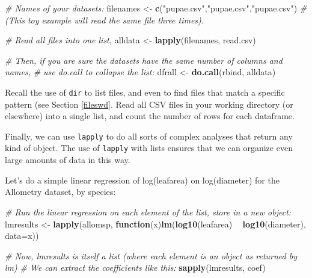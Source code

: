 \documentclass[]{book}
\newenvironment{Shaded}{\begin{snugshade}}{\end{snugshade}}
\newcommand{\CommentTok}[1]{\textcolor[rgb]{0.56,0.35,0.01}{\textit{#1}}}
\newcommand{\ControlFlowTok}[1]{\textcolor[rgb]{0.13,0.29,0.53}{\textbf{#1}}}
\newcommand{\DataTypeTok}[1]{\textcolor[rgb]{0.13,0.29,0.53}{#1}}
\newcommand{\KeywordTok}[1]{\textcolor[rgb]{0.13,0.29,0.53}{\textbf{#1}}}
\newcommand{\NormalTok}[1]{#1}
\newcommand{\OperatorTok}[1]{\textcolor[rgb]{0.81,0.36,0.00}{\textbf{#1}}}
\newcommand{\StringTok}[1]{\textcolor[rgb]{0.31,0.60,0.02}{#1}}
\let\BeginKnitrBlock\begin \let\EndKnitrBlock\end
\begin{document}
\begin{Shaded}
\begin{Highlighting}[]
\CommentTok{# Names of your datasets:}
\NormalTok{filenames <-}\StringTok{ }\KeywordTok{c}\NormalTok{(}\StringTok{"pupae.csv"}\NormalTok{,}\StringTok{"pupae.csv"}\NormalTok{,}\StringTok{"pupae.csv"}\NormalTok{)}
\CommentTok{# (This toy example will read the same file three times).}

\CommentTok{# Read all files into one list,}
\NormalTok{alldata <-}\StringTok{ }\KeywordTok{lapply}\NormalTok{(filenames, read.csv)}

\CommentTok{# Then, if you are sure the datasets have the same number of columns and names,}
\CommentTok{# use do.call to collapse the list:}
\NormalTok{dfrall <-}\StringTok{ }\KeywordTok{do.call}\NormalTok{(rbind, alldata)}
\end{Highlighting}
\end{Shaded}

\BeginKnitrBlock{rmdtry}
Recall the use of \texttt{dir} to list files, and even to find files that match a specific pattern (see Section \ref{fileswd}. Read all CSV files in your working directory (or elsewhere) into a single list, and count the number of rows for each dataframe.
\EndKnitrBlock{rmdtry}

Finally, we can use \texttt{lapply} to do all sorts of complex analyses that return any kind of object. The use of \texttt{lapply} with lists ensures that we can organize even large amounts of data in this way.

Let's do a simple linear regression of log(leafarea) on log(diameter) for the Allometry dataset, by species:

\begin{Shaded}
\begin{Highlighting}[]
\CommentTok{# Run the linear regression on each element of the list, store in a new object:}
\NormalTok{lmresults <-}\StringTok{ }\KeywordTok{lapply}\NormalTok{(allomsp, }\ControlFlowTok{function}\NormalTok{(x)}\KeywordTok{lm}\NormalTok{(}\KeywordTok{log10}\NormalTok{(leafarea) }\OperatorTok{~}\StringTok{ }\KeywordTok{log10}\NormalTok{(diameter), }\DataTypeTok{data=}\NormalTok{x))}

\CommentTok{# Now, lmresults is itself a list (where each element is an object as returned by lm)}
\CommentTok{# We can extract the coefficients like this:}
\KeywordTok{sapply}\NormalTok{(lmresults, coef)}
\end{Highlighting}
\end{Shaded}
\end{document}
